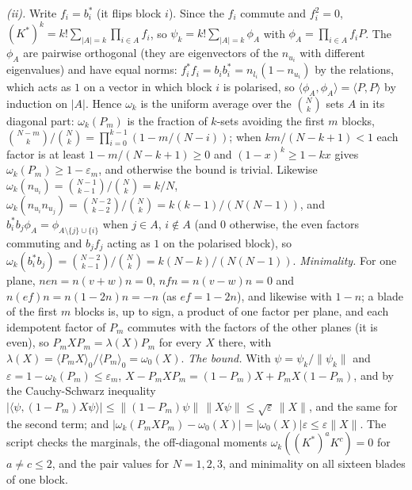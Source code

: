 \emph{(ii).} Write $f_{i} = b_{i}^{*}$ (it flips block $i$). Since the $f_{i}$ commute and $f_{i}^{2} = 0$, $(K^{*})^{k} = k!\sum_{|A| = k}\prod_{i \in A}f_{i}$, so $\psi_{k} = k!\sum_{|A|=k}\phi_{A}$ with $\phi_{A} = \prod_{i\in A}f_{i}P$. The $\phi_{A}$ are pairwise orthogonal (they are eigenvectors of the $n_{u_{i}}$ with different eigenvalues) and have equal norms: $f_{i}^{*}f_{i} = b_{i}b_{i}^{*} = n_{l_{i}}(1 - n_{u_{i}})$ by the relations, which acts as $1$ on a vector in which block $i$ is polarised, so $\langle\phi_{A}, \phi_{A}\rangle = \langle P, P\rangle$ by induction on $|A|$. Hence $\omega_{k}$ is the uniform average over the $\binom{N}{k}$ sets $A$ in its diagonal part: $\omega_{k}(P_{m})$ is the fraction of $k$-sets avoiding the first $m$ blocks, $\binom{N - m}{k}/\binom{N}{k} = \prod_{i=0}^{k-1}(1 - m/(N - i))$; when $km/(N - k + 1) < 1$ each factor is at least $1 - m/(N - k + 1) \ge 0$ and $(1 - x)^{k} \ge 1 - kx$ gives $\omega_{k}(P_{m}) \ge 1 - \varepsilon_{m}$, and otherwise the bound is trivial. Likewise $\omega_{k}(n_{u_{i}}) = \binom{N-1}{k-1}/\binom{N}{k} = k/N$, $\omega_{k}(n_{u_{i}}n_{u_{j}}) = \binom{N-2}{k-2}/\binom{N}{k} = k(k - 1)/(N(N - 1))$, and $b_{i}^{*}b_{j}\phi_{A} = \phi_{A \setminus\{j\} \cup \{i\}}$ when $j \in A$, $i \notin A$ (and $0$ otherwise, the even factors commuting and $b_{j}f_{j}$ acting as $1$ on the polarised block), so $\omega_{k}(b_{i}^{*}b_{j}) = \binom{N-2}{k-1}/\binom{N}{k} = k(N - k)/(N(N - 1))$. \emph{Minimality.} For one plane, $n e n = n(v + w)n = 0$, $n f n = n(v - w)n = 0$ and $n(ef)n = n(1 - 2n)n = -n$ (as $ef = 1 - 2n$), and likewise with $1 - n$; a blade of the first $m$ blocks is, up to sign, a product of one factor per plane, and each idempotent factor of $P_{m}$ commutes with the factors of the other planes (it is even), so $P_{m}XP_{m} = \lambda(X)P_{m}$ for every $X$ there, with $\lambda(X) = \langle P_{m}X\rangle_{0}/\langle P_{m}\rangle_{0} = \omega_{0}(X)$. \emph{The bound.} With $\psi = \psi_{k}/\|\psi_{k}\|$ and $\varepsilon = 1 - \omega_{k}(P_{m}) \le \varepsilon_{m}$, $X - P_{m}XP_{m} = (1 - P_{m})X + P_{m}X(1 - P_{m})$, and by the Cauchy-Schwarz inequality $|\langle\psi, (1 - P_{m})X\psi\rangle| \le \|(1 - P_{m})\psi\|\,\|X\psi\| \le \sqrt{\varepsilon}\,\|X\|$, and the same for the second term; and $|\omega_{k}(P_{m}XP_{m}) - \omega_{0}(X)| = |\omega_{0}(X)|\varepsilon \le \varepsilon\|X\|$. The script checks the marginals, the off-diagonal moments $\omega_{k}((K^{*})^{a}K^{c}) = 0$ for $a \ne c \le 2$, and the pair values for $N = 1, 2, 3$, and minimality on all sixteen blades of one block.

